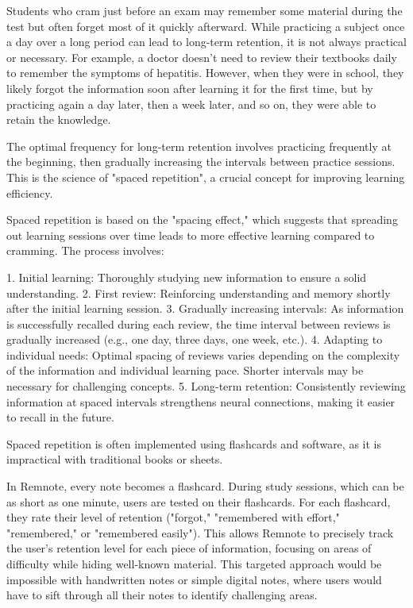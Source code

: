 \documentclass{article}
\begin{document}
Students who cram just before an exam may remember some material during
the test but often forget most of it quickly afterward.
While practicing a subject once a day over a long period can
lead to long-term retention, it is not always practical or necessary.
For example, a doctor doesn't need to review their textbooks daily to remember the symptoms of hepatitis.
However, when they were in school, they likely forgot the information
soon after learning it for the first time, but by practicing again
a day later, then a week later, and so on, they were able to retain
the knowledge.

The optimal frequency for long-term retention involves practicing
frequently at the beginning, then gradually increasing the intervals
between practice sessions. This is the science of "spaced repetition",
a crucial concept for improving learning efficiency.

Spaced repetition is based on the "spacing effect," which suggests
that spreading out learning sessions over time leads to more
effective learning compared to cramming. The process involves:

1. Initial learning: Thoroughly studying new information to ensure a solid understanding.
2. First review: Reinforcing understanding and memory shortly after the initial learning session.
3. Gradually increasing intervals: As information is successfully recalled during each review, the time interval between reviews is gradually increased (e.g., one day, three days, one week, etc.).
4. Adapting to individual needs: Optimal spacing of reviews varies depending on the complexity of the information and individual learning pace. Shorter intervals may be necessary for challenging concepts.
5. Long-term retention: Consistently reviewing information at spaced intervals strengthens neural connections, making it easier to recall in the future.

Spaced repetition is often implemented using flashcards and
software, as it is impractical with traditional books or sheets.

In Remnote, every note becomes a flashcard. During study sessions,
which can be as short as one minute, users are tested on their flashcards.
For each flashcard, they rate their level of retention
("forgot," "remembered with effort," "remembered," or "remembered easily").
This allows Remnote to precisely track the user's retention level
for each piece of information, focusing on areas of difficulty
while hiding well-known material. This targeted approach would be
impossible with handwritten notes or simple digital notes, where
users would have to sift through all their notes to identify challenging
areas.
\end{document}
